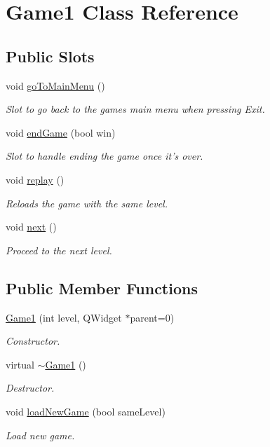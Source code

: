\hypertarget{classGame1}{\section{\-Game1 \-Class \-Reference}
\label{classGame1}
}
\subsection*{\-Public \-Slots}
\begin{DoxyCompactItemize}
\item 
void \hyperlink{classGame1_ad2deb82e0e796476d4e872b35b18298a}{go\-To\-Main\-Menu} ()
\begin{DoxyCompactList}\small\item\em \-Slot to go back to the games main menu when pressing \-Exit. \end{DoxyCompactList}\item 
void \hyperlink{classGame1_a77d143d518941d661ed7ed58d7709eb3}{end\-Game} (bool win)
\begin{DoxyCompactList}\small\item\em \-Slot to handle ending the game once it's over. \end{DoxyCompactList}\item 
void \hyperlink{classGame1_ae77aa2b2516135ecaa1667c8d3edc7c4}{replay} ()
\begin{DoxyCompactList}\small\item\em \-Reloads the game with the same level. \end{DoxyCompactList}\item 
void \hyperlink{classGame1_a556cb1f167454f0b668b706da20d403f}{next} ()
\begin{DoxyCompactList}\small\item\em \-Proceed to the next level. \end{DoxyCompactList}\end{DoxyCompactItemize}
\subsection*{\-Public \-Member \-Functions}
\begin{DoxyCompactItemize}
\item 
\hyperlink{classGame1_a8f936cce407e67e38223ce348c97f027}{\-Game1} (int level, \-Q\-Widget $\ast$parent=0)
\begin{DoxyCompactList}\small\item\em \-Constructor. \end{DoxyCompactList}\item 
virtual \hyperlink{classGame1_aa498b4499c4032cc7a65cc7755b1d3be}{$\sim$\-Game1} ()
\begin{DoxyCompactList}\small\item\em \-Destructor. \end{DoxyCompactList}\item 
void \hyperlink{classGame1_a5c85823c0c4c44e22bfa66146d04fcac}{load\-New\-Game} (bool same\-Level)
\begin{DoxyCompactList}\small\item\em \-Load new game. \end{DoxyCompactList}\end{DoxyCompactItemize}


